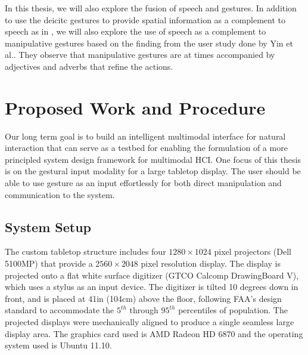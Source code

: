 In this thesis, we will also explore the fusion of speech and gestures. In
addition to use the deicitc gestures to provide spatial information as a complement to
speech as in \cite{Rauschert02}, we will also explore the use of speech as a
complement to manipulative gestures based on the finding from the user study
done by Yin et al.\cite{yin10}. They observe that manipulative gestures are at times
accompanied by adjectives and adverbs that refine the actions.

\section{Proposed Work and Procedure}
Our long term goal is to build an intelligent multimodal interface for natural
interaction that can serve as a testbed for enabling the formulation of a more
principled system design framework for multimodal HCI. One focus of this thesis
is on the gestural input modality for a large tabletop display. The user should
be able to use gesture as an input effortlessly for both direct manipulation and communication to the system.

\subsection{System Setup}
The custom tabletop structure includes four $1280\times1024$ pixel projectors 
(Dell 5100MP) that provide a $2560\times2048$ pixel resolution display. The
display is projected onto a flat white surface digitizer (GTCO Calcomp DrawingBoard V), 
which uses a stylus as an input device. The digitizer is tilted 10 degrees down 
in front, and is placed at 41in (104cm) above the floor, following FAA's design 
standard to accommodate the $5^{th}$ through $95^{th}$ percentiles of 
population. The projected displays were mechanically aligned to produce a single 
seamless large display area. The graphics card used is AMD
Radeon HD 6870 and the operating system used is Ubuntu 11.10.

